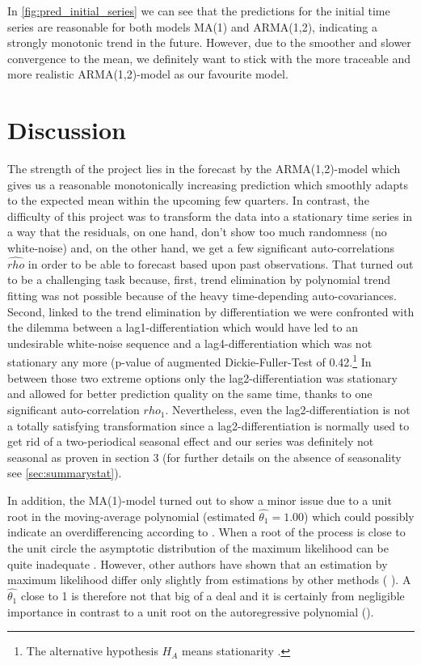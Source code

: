 \documentclass[11pt,a4paper]{article}
\begin{document}
In \cref{fig:pred_initial_series} we can see that the predictions for the initial time series are reasonable for both models MA(1) and ARMA(1,2), indicating a strongly monotonic trend in the future. However, due to the smoother and slower convergence to the mean, we definitely want to stick with the more traceable and more realistic ARMA(1,2)-model as our favourite model.





\section{Discussion}
The strength of the project lies in the forecast by the ARMA(1,2)-model which gives us a reasonable monotonically increasing prediction which smoothly adapts to the expected mean within the upcoming few quarters. 
In contrast, the difficulty of this project was to transform the data into a stationary time series in a way that the residuals, on one hand, don't show too much randomness (no white-noise) and, on the other hand, we get a few significant auto-correlations $\hat{rho}$ in order to be able to forecast based upon past observations. That turned out to be a challenging task because, first, trend elimination by polynomial trend fitting was not possible because of the heavy time-depending auto-covariances. Second, linked to the trend elimination by differentiation we were confronted with the dilemma between a lag1-differentiation which would have led to an undesirable white-noise sequence and a lag4-differentiation which was not stationary any more (p-value of augmented Dickie-Fuller-Test of 0.42.\footnote{The alternative hypothesis $H_A$ means stationarity \citep{adf}.} In between those two extreme options only the lag2-differentiation was stationary and allowed for better prediction quality on the same time, thanks to one significant auto-correlation $\hat{rho_1}$.
Nevertheless, even the lag2-differentiation is not a totally satisfying transformation since a lag2-differentiation is normally used to get rid of a two-periodical seasonal effect and our series was definitely not seasonal as proven in section 3 (for further details on the absence of seasonality see \cref{sec:summarystat}).
 
In addition, the MA(1)-model turned out to show a minor issue due to a unit root in the moving-average polynomial (estimated $\hat{\theta_1} = 1.00$) which could possibly indicate an overdifferencing according to \cite[~p.194]{bd02}. When a root of the process is close to the unit circle the asymptotic distribution of the maximum likelihood can be quite inadequate \citep{davidson81}. However, other authors have shown that an estimation by maximum likelihood differ only slightly from estimations by other methods (\citep{davisdunsmuir96} ). A $\hat{\theta_1}$ close to 1 is therefore not that big of a deal and it is certainly from negligible importance in contrast to a unit root on the autoregressive polynomial (\citep{plosser77}). 
\end{document}
